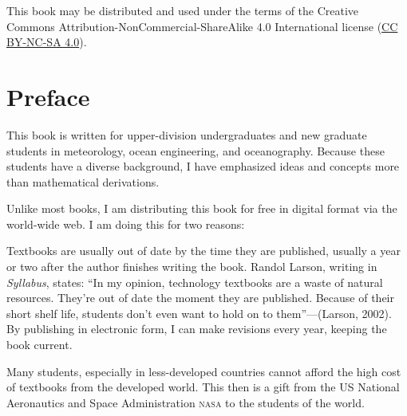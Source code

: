 
\vspace*{\fill}
\noindent{}This book may be distributed and used under the terms of the
Creative Commons Attribution-NonCommercial-ShareAlike 4.0 International
license (\href{https://creativecommons.org/licenses/by-nc-sa/4.0/legalcode}{CC BY-NC-SA 4.0}).
\tableofcontents

\chapter{Preface}
This book is written for upper-division undergraduates and new
graduate students in meteorology, ocean engineering, and
oceanography. Because these students have a diverse background, I have
emphasized ideas and concepts more than mathematical derivations.

Unlike most books, I am distributing this book for free in digital
format via the world-wide web. I am doing this for two reasons:
\begin{enumerate}
\vitem Textbooks are usually out of date by the time they are
published, usually a year or two after the author finishes writing the
book. Randol Larson, writing in \textit{Syllabus}, states: ``In my
opinion, technology textbooks are a waste of natural
resources. They're out of date the moment they are published. Because
of their short shelf life, students don't even want to hold on to
them''---(Larson, 2002). By publishing in electronic form, I can make
revisions every year, keeping the book current.

\vitem Many students, especially in less-developed countries cannot
afford the high cost of textbooks from the developed world. This then
is a gift from the US National Aeronautics and Space Administration
\textsc{nasa} to the students of the world.
\end{enumerate}

